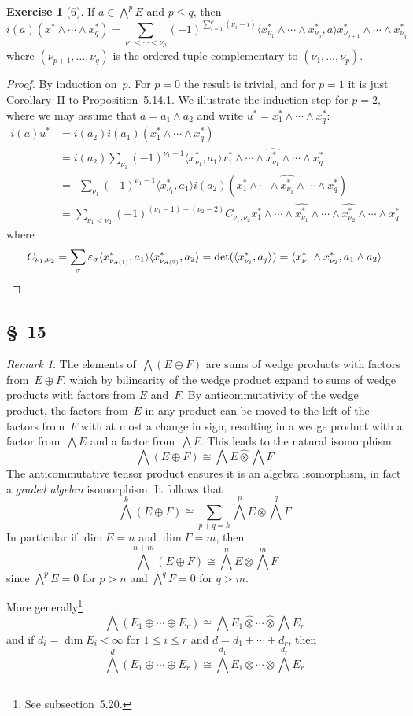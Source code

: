 \documentclass[letterpaper,12pt]{article}
\newcommand{\iso}{\cong}
\newcommand{\dsum}{\oplus}
\newcommand{\tprod}{\otimes}
\newcommand{\stprod}{\mathbin{\widehat{\otimes}}}
\newcommand{\eprod}{\wedge}
\newcommand{\bigeprod}{\bigwedge}
\newcommand{\medeprod}{{\textstyle\bigeprod}}
\newcommand{\delete}{\widehat}
\newcommand{\sprod}[2]{\langle#1,#2\rangle}
\newcommand{\multi}[4]{#2_{#3}#1\cdots#1#2_{#4}}
\newcommand{\dsums}[3]{\multi{\dsum}{#1}{#2}{#3}}
\newcommand{\stprods}[3]{\multi{\stprod}{#1}{#2}{#3}}
\newcommand{\eprods}[3]{\multi{\eprod}{#1}{#2}{#3}}
\newcommand{\sign}[1]{\varepsilon_{#1}}
\theoremstyle{definition}
\newtheorem*{exer}{Exercise}
\theoremstyle{remark}
\newtheorem*{rmk}{Remark}
\begin{document}
\begin{exer}[6]
If \(a\in\medeprod^p E\) and \(p\le q\), then
\[i(a)(\eprods{x^*}{1}{q})=\sum_{\nu_1<\cdots<\nu_p}(-1)^{\sum_{i=1}^p(\nu_i-i)}\sprod{\eprods{x^*}{\nu_1}{\nu_p}}{a}\eprods{x^*}{\nu_{p+1}}{\nu_q}\]
where \((\nu_{p+1},\ldots,\nu_q)\) is the ordered tuple complementary to \((\nu_1,\ldots,\nu_p)\).
\end{exer}
\begin{proof}
By induction on~\(p\). For \(p=0\) the result is trivial, and for \(p=1\) it is just Corollary~II to Proposition~5.14.1. We illustrate the induction step for \(p=2\), where we may assume that \(a=a_1\eprod a_2\) and write \(u^*=\eprods{x^*}{1}{q}\):
\begin{align*}
i(a)u^*&=i(a_2)i(a_1)(\eprods{x^*}{1}{q})\\
	&=i(a_2)\sum_{\nu_1}(-1)^{\nu_1-1}\sprod{x^*_{\nu_1}}{a_1}x^*_1\eprod\cdots\eprod\delete{x^*_{\nu_1}}\eprod\cdots\eprod x^*_q\\
	&=\ \ \sum_{\nu_1}(-1)^{\nu_1-1}\sprod{x^*_{\nu_1}}{a_1}i(a_2)(x^*_1\eprod\cdots\eprod\delete{x^*_{\nu_1}}\eprod\cdots\eprod x^*_q)\\
	&=\sum_{\nu_1<\nu_2}(-1)^{(\nu_1-1)+(\nu_2-2)}C_{\nu_1,\nu_2} x^*_1\eprod\cdots\eprod\delete{x^*_{\nu_1}}\eprod\cdots\eprod\delete{x^*_{\nu_2}}\eprod\cdots\eprod x^*_q
\end{align*}
where
\[C_{\nu_1,\nu_2}=\sum_{\sigma}\sign{\sigma}\sprod{x^*_{\nu_{\sigma(1)}}}{a_1}\sprod{x^*_{\nu_{\sigma(2)}}}{a_2}=\det(\sprod{x^*_{\nu_i}}{a_j})=\sprod{x^*_{\nu_1}\eprod x^*_{\nu_2}}{a_1\eprod a_2}\qedhere\]
\end{proof}

\subsection*{\S~15}
\begin{rmk}
The elements of~\(\medeprod(E\dsum F)\) are sums of wedge products with factors from~\(E\dsum F\), which by bilinearity of the wedge product expand to sums of wedge products with factors from \(E\) and~\(F\). By anticommutativity of the wedge product, the factors from~\(E\) in any product can be moved to the left of the factors from~\(F\) with at most a change in sign, resulting in a wedge product with a factor from~\(\medeprod E\) and a factor from~\(\medeprod F\). This leads to the natural isomorphism
\[\medeprod(E\dsum F)\iso\medeprod E\stprod\medeprod F\]
The anticommutative tensor product ensures it is an algebra isomorphism, in fact a \emph{graded algebra} isomorphism. It follows that
\[\medeprod^k(E\dsum F)\iso\sum_{p+q=k}\medeprod^p E\tprod\medeprod^q F\]
In particular if \(\dim E=n\) and \(\dim F=m\), then
\[\medeprod^{n+m}(E\dsum F)\iso\medeprod^n E\tprod\medeprod^m F\]
since \(\medeprod^p E=0\) for \(p>n\) and \(\medeprod^q F=0\) for \(q>m\).

More generally\footnote{See subsection~5.20.}
\[\medeprod(\dsums{E}{1}{r})\iso\stprods{\medeprod E}{1}{r}\]
and if \(d_i=\dim E_i<\infty\) for \(1\le i\le r\) and \(d=d_1+\cdots+d_r\), then
\[\medeprod^d(\dsums{E}{1}{r})\iso\medeprod^{d_1}E_1\tprod\cdots\tprod\medeprod^{d_r}E_r\]
\end{rmk}
\end{document}
